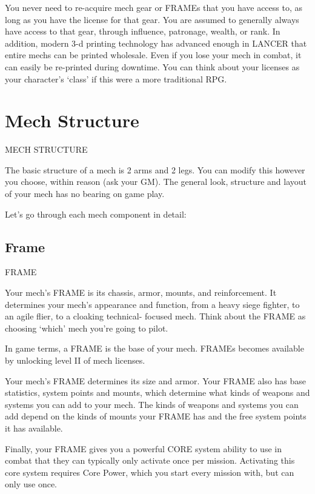 You never need to re-acquire mech gear or FRAMEs that you have access to, as long as you
have the license for that gear. You are assumed to generally always have access to that gear,
through influence, patronage, wealth, or rank. In addition, modern 3-d printing technology has
advanced enough in LANCER that entire mechs can be printed wholesale. Even if you lose your
mech in combat, it can easily be re-printed during downtime. You can think about your licenses
as your character’s ‘class’ if this were a more traditional RPG.

\section{Mech Structure}
                                        MECH STRUCTURE




The basic structure of a mech is 2 arms and 2 legs. You can modify this however you choose,
within reason (ask your GM). The general look, structure and layout of your mech has no
bearing on game play.


Let’s go through each mech component in detail:

\subsection{Frame}
                                                 FRAME

Your mech’s FRAME is its chassis, armor, mounts, and reinforcement. It determines your mech’s
appearance and function, from a heavy siege fighter, to an agile flier, to a cloaking technical-
focused mech. Think about the FRAME as choosing ‘which’ mech you’re going to pilot.


In game terms, a FRAME is the base of your mech. FRAMEs becomes available by unlocking
level II of mech licenses.


Your mech’s FRAME determines its size and armor. Your FRAME also has base statistics,
system points and mounts, which determine what kinds of weapons and systems you can add
to your mech. The kinds of weapons and systems you can add depend on the kinds of mounts
your FRAME has and the free system points it has available.


Finally, your FRAME gives you a powerful CORE system ability to use in combat that they can
typically only activate once per mission. Activating this core system requires Core Power, which
you start every mission with, but can only use once.

